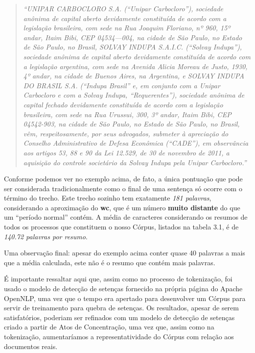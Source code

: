 \documentclass[11pt]{report}
\newcommand{\quotes}[1]{``#1''}
\begin{document}
\begin{quote}
  \textit{\quotes{UNIPAR CARBOCLORO S.A. (“Unipar Carbocloro”), sociedade anônima de capital aberto devidamente constituída de acordo com a legislação brasileira, com sede na Rua
  Joaquim Floriano, nº 960, 15º andar, Itaim Bibi, CEP 04534—004, na cidade de São Paulo, no Estado de São Paulo, no Brasil, SOLVAY INDUPA S.A.I.C. (“Solvay Indupa”),
  sociedade anônima de capital aberto devidamente constituída de acordo com a legislação argentina, com sede na Avenida Alicia Moreau de Justo, 1930, 4º andar, na cidade de
  Buenos Aires, na Argentina, e SOLVAY INDUPA DO BRASIL S.A. (“Indupa Brasil” e, em conjunto com a Unipar Carbocloro e com a Solvay Indupa, “Requerentes”), sociedade anônima
  de capital fechado devidamente constituída de acordo com a legislação brasileira, com sede na Rua Urussui, 300, 3º andar, Itaim Bibi, CEP 04542-903, na cidade de São Paulo,
  no Estado de São Paulo, no Brasil, vêm, respeitosamente, por seus advogados, submeter à apreciação do Conselho Administrativo de Defesa Econômica (“CADE”), em observância aos
  artigos 53, 88 e 90 da Lei 12.529, de 30 de novembro de 2011, a aquisição do controle societário da Solvay Indupa pela Unipar Carbocloro.}}
\end{quote}

Conforme podemos ver no exemplo acima, de fato, a única pontuação que pode ser considerada tradicionalmente como o final de uma sentença só ocorre com o término do trecho. Este trecho
sozinho tem exatamente \textit{181 palavras}, considerando a aproximação do \textbf{wc}, que é um número \textbf{muito distante} do que um \quotes{período normal} contém. A média
de caracteres considerando os resumos de todos os processos que constituem o nosso Córpus, listados na tabela 3.1, é de \textit{140.72 palavras por resumo}.

Uma observação final: apesar do exemplo acima conter quase 40 palavras a mais que a média calculada, este não é o resumo que contém mais palavras.

É importante ressaltar aqui que, assim como no processo de tokenização, foi usado o modelo de detecção de setenças fornecido na própria página do Apache OpenNLP, uma vez que o tempo era
apertado para desenvolver um Córpus para servir de treinamento para quebra de setenças. Os resultados, apesar de serem satisfatórios, poderiam ser refinados com um modelo
de detecção de setenças criado a partir de Atos de Concentração, uma vez que, assim como na tokenização, aumentaríamos a representatividade do Córpus com relação aos documentos
reais.
\end{document}
